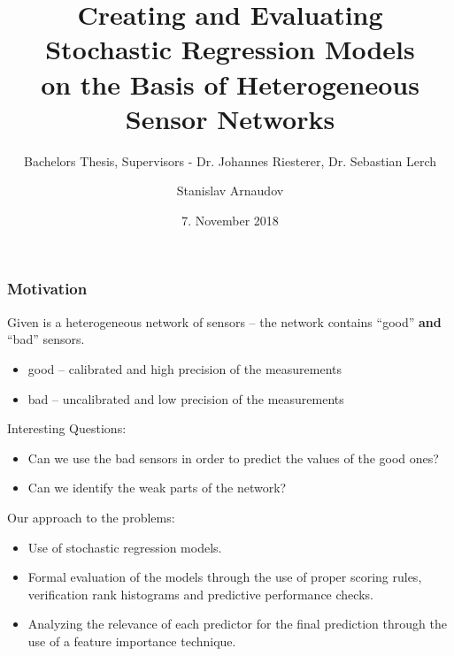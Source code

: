 \documentclass[18pt]{beamer}
\title[Bachelor's Thesis]{Creating and Evaluating \\Stochastic Regression Models \\on the Basis of Heterogeneous Sensor Networks}
\subtitle{Bachelors Thesis, Supervisors  - Dr. Johannes Riesterer, Dr. Sebastian Lerch}
\author{Stanislav Arnaudov}
\date{7. November 2018}
\institute{TECO - Das Telecooperation Office}
\begin{document}
 



\begin{frame}
  \titlepage
\end{frame}

\begin{frame}
  \frametitle{Motivation}  
  Given is a heterogeneous network of sensors -- the network contains ``good'' \textbf{and} ``bad'' sensors.\\
  \begin{itemize}
  \item good -- calibrated and high precision of the measurements 
  \item bad -- uncalibrated and low precision of the measurements
  \end{itemize}
  Interesting Questions:
  \begin{itemize}
  \item Can we use the bad sensors in order to predict the values of the good ones?
  \item Can we identify the weak parts of the network?
  \end{itemize}
  Our approach to the problems:
  \begin{itemize}
  \item Use of stochastic regression models.
  \item Formal evaluation of the models through the use of proper scoring rules, verification rank histograms and predictive performance checks.
  \item Analyzing the relevance of each predictor for the final prediction through the use of a feature importance technique.
  \end{itemize}
\end{frame}
\end{document}
